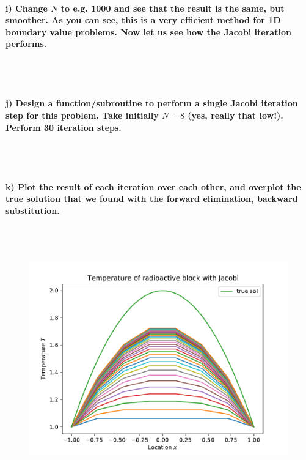 \paragraph{
    i) Change $N$ to e.g. 1000 and see that the result is the same, but
    smoother. As you can see, this is a very efficient method for 1D
    boundary value problems. Now let us see how the Jacobi iteration
    performs.
} \ \\
    \\

\paragraph{
    j) Design a function/subroutine to perform a single Jacobi iteration
    step for this problem. Take initially $N=8$ (yes, really that low!).
    Perform 30 iteration steps.
} \ \\
    \\

\paragraph{
    k) Plot the result of each iteration over each other, and overplot
    the true solution that we found with the forward elimination,
    backward substitution.
} \ \\
    \\
    \begin{figure}[h!]
        \centering
        \includegraphics[width=.7\textwidth]{../figures/Aufg1k.pdf}
    \end{figure} \ \\ 

\newpage

